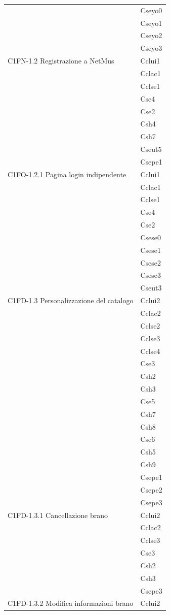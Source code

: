 \begin{footnotesize}
\begin{longtable}[!h]{|l|l|}
& Cseyo0\\
& Cseyo1\\
& Cseyo2\\
& Cseyo3\\\hline
C1FN-1.2 Registrazione a NetMus & Cclui1\\
& Cclac1\\
& Cclse1\\
& Cse4\\
& Cse2\\
& Csh4\\
& Csh7\\
& Cseut5\\
& Csepe1\\\hline
C1FO-1.2.1 Pagina login indipendente & Cclui1\\
& Cclac1\\
& Cclse1\\
& Cse4\\
& Cse2\\
& Csese0\\
& Csese1\\
& Csese2\\
& Csese3\\
& Cseut3\\\hline
C1FD-1.3 Personalizzazione del catalogo & Cclui2\\
& Cclac2\\
& Cclse2\\
& Cclse3\\
& Cclse4\\
& Cse3\\
& Csh2\\
& Csh3\\
& Cse5\\
& Csh7\\
& Csh8\\
& Cse6\\
& Csh5\\
& Csh9\\
& Csepe1\\
& Csepe2\\
& Csepe3\\\hline 
C1FD-1.3.1 Cancellazione brano & Cclui2\\
& Cclac2\\
& Cclse3\\
& Cse3\\
& Csh2\\
& Csh3\\
& Csepe3\\\hline  
C1FD-1.3.2 Modifica informazioni brano & Cclui2\\

\end{longtable}
\end{footnotesize}
